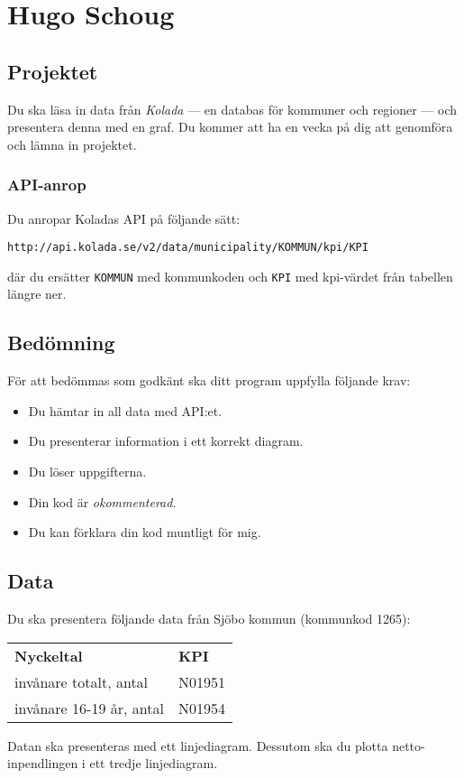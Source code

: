 \section{Hugo Schoug}

\subsection{Projektet}

Du ska läsa in data från \textit{Kolada} --- en databas för kommuner och regioner --- och presentera denna med en graf. Du kommer att ha en vecka på dig att genomföra och lämna in projektet.

\subsubsection{API-anrop}

Du anropar Koladas API på följande sätt:

\texttt{http://api.kolada.se/v2/data/municipality/KOMMUN/kpi/KPI}

\noindent där du ersätter \texttt{KOMMUN} med kommunkoden och \texttt{KPI} med kpi-värdet från tabellen längre ner.

\subsection{Bedömning}

För att bedömmas som godkänt ska ditt program uppfylla följande krav:

\begin{itemize}
	\item Du hämtar in all data med API:et.
	\item Du presenterar information i ett korrekt diagram.
	\item Du löser uppgifterna.
	\item Din kod är \textit{okommenterad}.
	\item Du kan förklara din kod muntligt för mig.
\end{itemize}

\subsection{Data}

Du ska presentera följande data från Sjöbo kommun (kommunkod 1265):

\begin{center}
	\begin{tabular}{ll}
		\rowcolor{blue!25}
		\textbf{Nyckeltal} & \textbf{KPI}\\
		invånare totalt, antal	& N01951\\
		invånare 16-19 år, antal & N01954
	\end{tabular}
\end{center}

Datan ska presenteras med ett linjediagram. Dessutom ska du plotta netto-inpendlingen i ett tredje linjediagram.

\clearpage